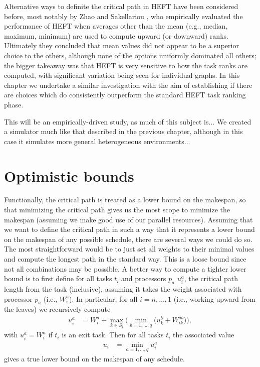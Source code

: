 \documentclass[12pt]{article}
\begin{document}
Alternative ways to definite the critical path in HEFT have been considered before, most notably by Zhao and Sakellariou \cite{zhao03}, who empirically evaluated the performance of HEFT when averages other than the mean (e.g., median, maximum, minimum) are used to compute upward (or downward) ranks. Ultimately they concluded that mean values did not appear to be a superior choice to the others, although none of the options uniformly dominated all others; the bigger takeaway was that HEFT is very sensitive to how the task ranks are computed, with significant variation being seen for individual graphs. In this chapter we undertake a similar investigation with the aim of establishing if there are choices which do consistently outperform the standard HEFT task ranking phase.   

This will be an empirically-driven study, as much of this subject is... We created a simulator much like that described in the previous chapter, although in this case it simulates more general heterogeneous environments...


\section{Optimistic bounds}
\label{sect.optimistic}

Functionally, the critical path is treated as a lower bound on the makespan, so that minimizing the critical path gives us the most scope to minimize the makespan (assuming we make good use of our parallel resources). Assuming that we want to define the critical path in such a way that it represents a lower bound on the makespan of any possible schedule, there are several ways we could do so. The most straightforward would be to just set all weights to their minimal values and compute the longest path in the standard way. This is a loose bound since not all combinations may be possible. A better way to compute a tighter lower bound is to first define for all tasks $t_i$ and processors $p_a$ $u_i^a$, the critical path length from the task (inclusive), assuming it takes the weight associated with processor $p_a$ (i.e., $W_i^a$). In particular, for all $i = n, \dots, 1$ (i.e., working upward from the leaves) we recursively compute   
\begin{align}
u_i^a &= W_i^a + \max_{k \in S_i} \bigg( \min_{b = 1, \dots, q} \big( u_k^b + W_{ik}^{ab} \big)  \bigg), \label{eq.opt_uia} 
\end{align}
with $u_i^a = W_i^a$ if $t_i$ is an exit task. Then for all tasks $t_i$ the associated value
\begin{align}
u_i &= \min_{a = 1, \dots, q}u_i^a \label{eq.opt_ui} 
\end{align}
gives a true lower bound on the makespan of any schedule. 
\end{document}
